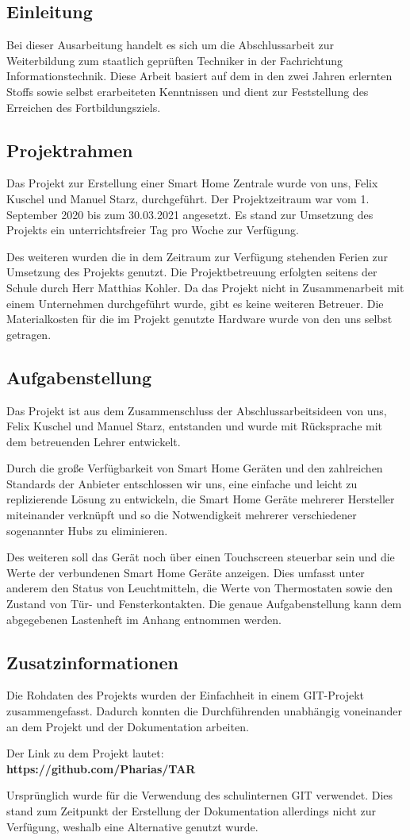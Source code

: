 \documentclass[12pt,a4paper]{article}
\begin{document}
 	\subsection{Einleitung}
 	Bei dieser Ausarbeitung handelt es sich um die Abschlussarbeit zur Weiterbildung zum staatlich geprüften Techniker in der Fachrichtung Informationstechnik. Diese Arbeit basiert auf dem in den zwei Jahren erlernten Stoffs sowie selbst erarbeiteten Kenntnissen und dient zur Feststellung des Erreichen des Fortbildungsziels.
 	\subsection{Projektrahmen}
 	Das Projekt zur Erstellung einer Smart Home Zentrale wurde von uns, Felix Kuschel und Manuel Starz, durchgeführt. Der Projektzeitraum war vom 1. September 2020 bis zum 30.03.2021 angesetzt. Es stand zur Umsetzung des Projekts ein unterrichtsfreier Tag pro Woche zur Verfügung.\par
 	Des weiteren wurden die in dem Zeitraum zur Verfügung stehenden Ferien zur Umsetzung des Projekts genutzt. Die Projektbetreuung erfolgten seitens der Schule durch Herr Matthias Kohler. Da das Projekt nicht in Zusammenarbeit mit einem Unternehmen durchgeführt wurde, gibt es keine weiteren Betreuer. Die Materialkosten für die im Projekt genutzte Hardware wurde von den uns selbst getragen.
 	\subsection{Aufgabenstellung}
 	Das Projekt ist aus dem Zusammenschluss der Abschlussarbeitsideen von uns, Felix Kuschel und Manuel Starz, entstanden und wurde mit Rücksprache mit dem betreuenden Lehrer entwickelt.\par
 	 Durch die große Verfügbarkeit von Smart Home Geräten und den zahlreichen Standards der Anbieter entschlossen wir uns, eine einfache und leicht zu replizierende Lösung zu entwickeln, die Smart Home Geräte mehrerer Hersteller miteinander verknüpft und so die Notwendigkeit mehrerer verschiedener sogenannter Hubs zu eliminieren. \par
 	Des weiteren soll das Gerät noch über einen Touchscreen steuerbar sein und die Werte der verbundenen Smart Home Geräte anzeigen. Dies umfasst unter anderem den Status von Leuchtmitteln, die Werte von Thermostaten sowie den Zustand von Tür- und Fensterkontakten. Die genaue Aufgabenstellung kann dem abgegebenen Lastenheft im Anhang entnommen werden.
 	\subsection{Zusatzinformationen}
 	Die Rohdaten des Projekts wurden der Einfachheit in einem GIT-Projekt zusammengefasst. Dadurch konnten die Durchführenden unabhängig voneinander an dem Projekt und der Dokumentation arbeiten.\par
 	Der Link zu dem Projekt lautet:\\
 	\textbf{https://github.com/Pharias/TAR}\par
 	Ursprünglich wurde für die Verwendung des schulinternen GIT verwendet. Dies stand zum Zeitpunkt der Erstellung der Dokumentation allerdings nicht zur Verfügung, weshalb eine Alternative genutzt wurde.
\end{document}
